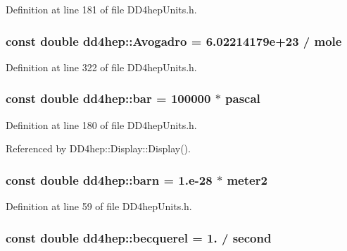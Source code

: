Definition at line 181 of file DD4hepUnits.h.\hypertarget{namespacedd4hep_a674bc3e17add397df97b4b8222ad8a1e}{
\subsubsection[{Avogadro}]{\setlength{\rightskip}{0pt plus 5cm}const double {\bf dd4hep::Avogadro} = 6.02214179e+23 / mole}}
\label{namespacedd4hep_a674bc3e17add397df97b4b8222ad8a1e}


Definition at line 322 of file DD4hepUnits.h.\hypertarget{namespacedd4hep_a77aaec852fdd6717b70a272fe4ef0473}{
\subsubsection[{bar}]{\setlength{\rightskip}{0pt plus 5cm}const double {\bf dd4hep::bar} = 100000 $\ast$ pascal}}
\label{namespacedd4hep_a77aaec852fdd6717b70a272fe4ef0473}


Definition at line 180 of file DD4hepUnits.h.

Referenced by DD4hep::Display::Display().\hypertarget{namespacedd4hep_a561a205dfb5e2f3151e032ad640f1d35}{
\subsubsection[{barn}]{\setlength{\rightskip}{0pt plus 5cm}const double {\bf dd4hep::barn} = 1.e-\/28 $\ast$ {\bf meter2}}}
\label{namespacedd4hep_a561a205dfb5e2f3151e032ad640f1d35}


Definition at line 59 of file DD4hepUnits.h.\hypertarget{namespacedd4hep_a3c71f55bed97c3b05c92c0b81b3bb17e}{
\subsubsection[{becquerel}]{\setlength{\rightskip}{0pt plus 5cm}const double {\bf dd4hep::becquerel} = 1. / {\bf second}}}
\label{namespacedd4hep_a3c71f55bed97c3b05c92c0b81b3bb17e}


